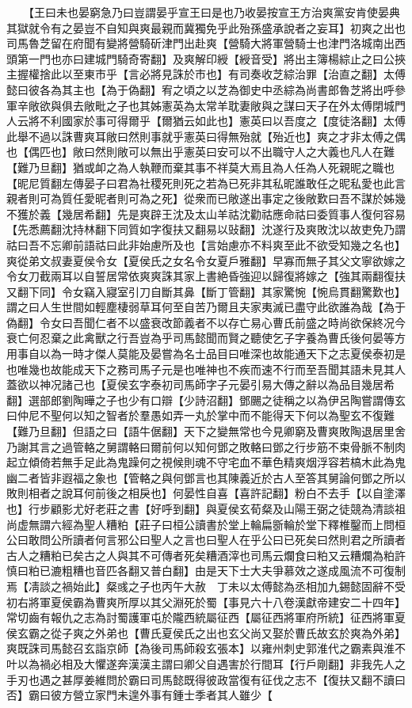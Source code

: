 　　【王曰未也晏窮急乃曰豈謂晏乎宣王曰是也乃收晏按宣王方治爽黨安肯使晏典其獄就令有之晏豈不自知與爽最親而冀獨免乎此殆孫盛承說者之妄耳】初爽之出也司馬魯芝留在府聞有變將營騎斫津門出赴爽【營騎大將軍營騎士也津門洛城南出西頭第一門也亦曰建城門騎奇寄翻】及爽解印綬【綬音受】將出主簿楊綜止之曰公挾主握權捨此以至東市乎【言必將見誅於市也】有司奏收芝綜治罪【治直之翻】太傅懿曰彼各為其主也【為于偽翻】宥之頃之以芝為御史中丞綜為尚書郎魯芝將出呼參軍辛敞欲與俱去敞毗之子也其姊憲英為太常羊耽妻敞與之謀曰天子在外太傅閉城門人云將不利國家於事可得爾乎【爾猶云如此也】憲英曰以吾度之【度徒洛翻】太傅此舉不過以誅曹爽耳敞曰然則事就乎憲英曰得無殆就【殆近也】爽之才非太傅之偶也【偶匹也】敞曰然則敞可以無出乎憲英曰安可以不出職守人之大義也凡人在難【難乃旦翻】猶或卹之為人執鞭而棄其事不祥莫大焉且為人任為人死親昵之職也【昵尼質翻左傳晏子曰君為社稷死則死之若為已死非其私昵誰敢任之昵私愛也此言親者則可為質任愛昵者則可為之死】從衆而已敞遂出事定之後敞歎曰吾不謀於姊幾不獲於義【幾居希翻】先是爽辟王沈及太山羊祜沈勸祜應命祜曰委質事人復何容易【先悉薦翻沈持林翻下同質如字復扶又翻易以䜴翻】沈遂行及爽敗沈以故吏免乃謂祜曰吾不忘卿前語祜曰此非始慮所及也【言始慮亦不料爽至此不欲受知幾之名也】爽從弟文叔妻夏侯令女【夏侯氏之女名令女夏戶雅翻】早寡而無子其父文寧欲嫁之令女刀截兩耳以自誓居常依爽爽誅其家上書絶昏強迎以歸復將嫁之【強其兩翻復扶又翻下同】令女竊入寢室引刀自斷其鼻【斷丁管翻】其家驚惋【惋烏貫翻驚歎也】謂之曰人生世間如輕塵棲弱草耳何至自苦乃爾且夫家夷滅已盡守此欲誰為哉【為于偽翻】令女曰吾聞仁者不以盛衰改節義者不以存亡易心曹氏前盛之時尚欲保終况今衰亡何忍棄之此禽獸之行吾豈為乎司馬懿聞而賢之聽使乞子字養為曹氏後何晏等方用事自以為一時才傑人莫能及晏嘗為名士品目曰唯深也故能通天下之志夏侯泰初是也唯幾也故能成天下之務司馬子元是也唯神也不疾而速不行而至吾聞其語未見其人蓋欲以神况諸己也【夏侯玄字泰初司馬師字子元晏引易大傳之辭以為品目幾居希翻】選部郎劉陶曄之子也少有口辯【少詩沼翻】鄧颺之徒稱之以為伊呂陶嘗謂傳玄曰仲尼不聖何以知之智者於羣愚如弄一丸於掌中而不能得天下何以為聖玄不復難【難乃旦翻】但語之曰【語牛倨翻】天下之變無常也今見卿窮及曹爽敗陶退居里舍乃謝其言之過管輅之舅謂輅曰爾前何以知何鄧之敗輅曰鄧之行步筋不束骨脈不制肉起立傾倚若無手足此為鬼躁何之視候則魂不守宅血不華色精爽烟浮容若槁木此為鬼幽二者皆非遐福之象也【管輅之與何鄧言也其陳義近於古人至答其舅論何鄧之所以敗則相者之說耳何前後之相戾也】何晏性自喜【喜許記翻】粉白不去手【以自塗澤也】行步顧影尤好老莊之書【好呼到翻】與夏侯玄荀粲及山陽王弼之徒競為清談祖尚虚無謂六經為聖人糟粕【莊子曰桓公讀書於堂上輪扁斵輪於堂下釋椎鑿而上問桓公曰敢問公所讀者何言邪公曰聖人之言也曰聖人在乎公曰已死矣曰然則君之所讀者古人之糟粕已矣古之人與其不可傳者死矣糟酒滓也司馬云爛食曰粕又云糟爛為粕許慎曰粕已漉粗糟也音匹各翻又普白翻】由是天下士大夫爭慕效之遂成風流不可復制焉【凊談之禍始此】粲彧之子也丙午大赦　丁未以太傅懿為丞相加九錫懿固辭不受　初右將軍夏侯霸為曹爽所厚以其父淵死於蜀【事見六十八卷漢獻帝建安二十四年】常切齒有報仇之志為討蜀護軍屯於隴西統屬征西【屬征西將軍府所統】征西將軍夏侯玄霸之從子爽之外弟也【曹氏夏侯氏之出也玄父尚又娶於曹氏故玄於爽為外弟】爽既誅司馬懿召玄詣京師【為後司馬師殺玄張本】以雍州刺史郭淮代之霸素與淮不叶以為禍必相及大懼遂奔漢漢主謂曰卿父自遇害於行間耳【行戶剛翻】非我先人之手刃也遇之甚厚姜維問於霸曰司馬懿既得彼政當復有征伐之志不【復扶又翻不讀曰否】霸曰彼方營立家門未遑外事有鍾士季者其人雖少【